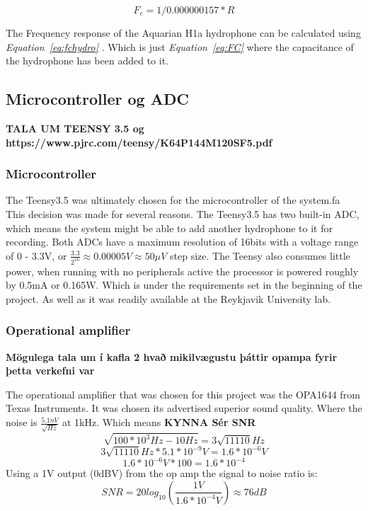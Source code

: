 \begin{equation}
F_c = 1 / 0.000000157 * R  
\label{eq:fchydro}
\end{equation}

The Frequency response of the Aquarian H1a hydrophone can be calculated using \textit{Equation~\ref{eq:fchydro}} \cite{noauthor_aquarian_nodate}. 
Which is just \textit{Equation~\ref{eq:FC}} where the capacitance of the hydrophone has been added to it.


\subsection{Microcontroller og ADC}

\textbf{TALA UM TEENSY 3.5 og https://www.pjrc.com/teensy/K64P144M120SF5.pdf
}
\subsubsection{Microcontroller}
The Teensy3.5 was ultimately chosen for the microcontroller of the system.fa
This decision was made for several reasons.
The Teensy3.5 has two built-in ADC, which means the system might be able to add another hydrophone to it for recording.
Both ADCs have a maximum resolution of 16bits with a voltage range of 0 - 3.3V, or $\frac{3.3}{2^16} \approx 0.00005V \approx 50\mu V$ step size.
The Teensy also consumes little power, when running with no peripherals active the processor is powered roughly by 0.5mA or 0.165W.
Which is under the requirements set in the beginning of the project.
As well as it was readily available at the Reykjavik University lab.

\subsubsection{Operational amplifier}
\textbf{Mögulega tala um í kafla 2 hvað mikilvægustu þáttir opampa fyrir þetta verkefni var}

The operational amplifier that was chosen for this project was the OPA1644 from Texas Instruments.
It was chosen its advertised superior sound quality.
Where the noise is $\frac{5.1nV}{\sqrt{Hz}}$ at 1kHz.
Which means 
\textbf{KYNNA Sér SNR}
$$\sqrt{100*10^3Hz - 10Hz} = 3\sqrt{11110}Hz$$
$$3\sqrt{11110}Hz*5.1*10^{-9}V = 1.6*10^{-6}V$$
$$ 1.6*10^{-6}V * 100 = 1.6*10^{-4}$$
Using a 1V output (0dBV) from the op amp the signal to noise ratio is:
$$SNR = 20log_{10}(\frac{1V}{1.6*10^{-4}V}) \approx 76dB$$


